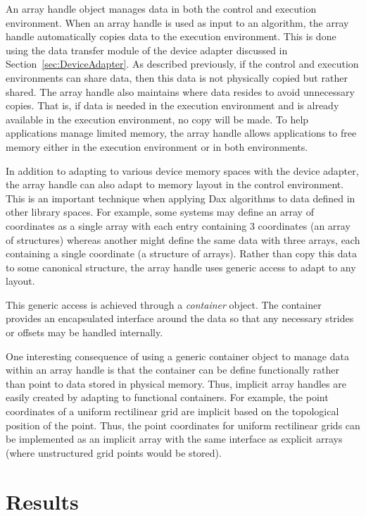 \documentclass[conference]{IEEEtran}
\newcommand*{\keyterm}[1]{\emph{#1}}
\begin{document}
An array handle object manages data in both the control and execution
environment.  When an array handle is used as input to an algorithm, the
array handle automatically copies data to the execution environment.  This
is done using the data transfer module of the device adapter discussed in
Section~\ref{sec:DeviceAdapter}.  As described previously, if the control
and execution environments can share data, then this data is not physically
copied but rather shared.  The array handle also maintains where data
resides to avoid unnecessary copies.  That is, if data is needed in the
execution environment and is already available in the execution environment,
no copy will be made.  To help applications manage limited memory, the
array handle allows applications to free memory either in the execution
environment or in both environments.

In addition to adapting to various device memory spaces with the device
adapter, the array handle can also adapt to memory layout in the control
environment.  This is an important technique when applying Dax algorithms
to data defined in other library spaces.  For example, some systems may
define an array of coordinates as a single array with each entry containing
3 coordinates (an array of structures) whereas another might define the
same data with three arrays, each containing a single coordinate (a
structure of arrays).  Rather than copy this data to some canonical
structure, the array handle uses generic access to adapt to any layout.

This generic access is achieved through a \keyterm{container} object.  The
container provides an encapsulated interface around the data so that any
necessary strides or offsets may be handled internally.

One interesting consequence of using a generic container object to manage
data within an array handle is that the container can be define
functionally rather than point to data stored in physical memory.  Thus,
implicit array handles are easily created by adapting to functional
containers.  For example, the point coordinates of a uniform rectilinear
grid are implicit based on the topological position of the point.  Thus,
the point coordinates for uniform rectilinear grids can be implemented as
an implicit array with the same interface as explicit arrays (where
unstructured grid points would be stored).

\section{Results}
\end{document}
